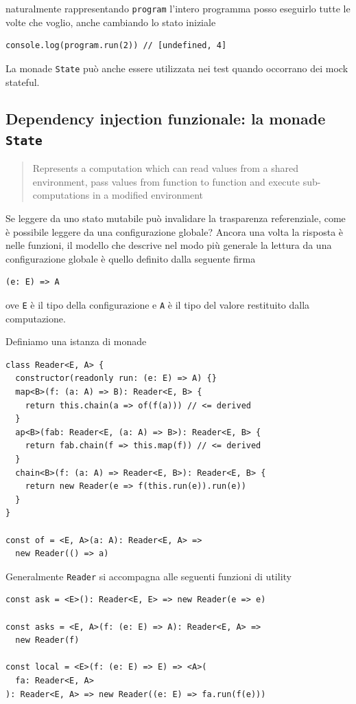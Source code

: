 \documentclass[12pt]{article}
\begin{document}
naturalmente rappresentando \texttt{program} l'intero programma posso eseguirlo tutte le volte che voglio,
anche cambiando lo stato iniziale

\begin{verbatim}
console.log(program.run(2)) // [undefined, 4]
\end{verbatim}

La monade \texttt{State} può anche essere utilizzata nei test quando occorrano dei mock stateful.

\subsection{Dependency injection funzionale: la monade \texttt{State}}

\begin{quote}
Represents a computation which can read values from a shared environment, pass values from function to function
and execute sub-computations in a modified environment
\end{quote}

Se leggere da uno stato mutabile può invalidare la trasparenza referenziale, come è possibile leggere da una configurazione globale?
Ancora una volta la risposta è nelle funzioni, il modello che descrive nel modo più generale la lettura da una configurazione globale
è quello definito dalla seguente firma

\begin{verbatim}
(e: E) => A
\end{verbatim}

ove \texttt{E} è il tipo della configurazione e \texttt{A} è il tipo del valore restituito dalla computazione.

Definiamo una istanza di monade

\begin{verbatim}
class Reader<E, A> {
  constructor(readonly run: (e: E) => A) {}
  map<B>(f: (a: A) => B): Reader<E, B> {
    return this.chain(a => of(f(a))) // <= derived
  }
  ap<B>(fab: Reader<E, (a: A) => B>): Reader<E, B> {
    return fab.chain(f => this.map(f)) // <= derived
  }
  chain<B>(f: (a: A) => Reader<E, B>): Reader<E, B> {
    return new Reader(e => f(this.run(e)).run(e))
  }
}

const of = <E, A>(a: A): Reader<E, A> =>
  new Reader(() => a)
\end{verbatim}

Generalmente \texttt{Reader} si accompagna alle seguenti funzioni di utility

\begin{verbatim}
const ask = <E>(): Reader<E, E> => new Reader(e => e)

const asks = <E, A>(f: (e: E) => A): Reader<E, A> =>
  new Reader(f)

const local = <E>(f: (e: E) => E) => <A>(
  fa: Reader<E, A>
): Reader<E, A> => new Reader((e: E) => fa.run(f(e)))
\end{verbatim}
\end{document}
